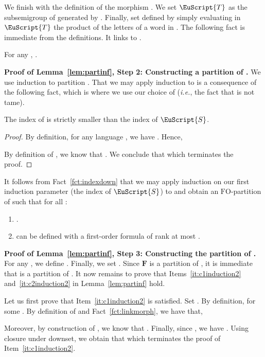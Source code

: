 \documentclass{CSML}
\newcommand\Ss{\ensuremath{\EuScript{S}}\xspace}
\newcommand\Ts{\ensuremath{\EuScript{T}}\xspace}
\newcommand\Fb{\ensuremath{\mathbf{F}}\xspace}
\newcommand{\fo}{\ensuremath{\text{FO}}\xspace}
\theoremstyle{plain}
\begin{document}
We finish with the definition of the morphism . We set \Ts as
the subsemigroup of  generated by . Finally, set  defined by simply evaluating in \Ts the
product of the letters of a word in . The following fact is
immediate from the definitions. It links  to .

\begin{fact} \label{fct:linkmorph}
For any , .
\end{fact}

\medskip
\noindent
{\bf Proof of Lemma~\ref{lem:partinf}, Step 2: Constructing a
  partition of .} We use induction to partition . That
we may apply induction to   is a consequence of the following
fact, which is where we use our choice of  (\emph{i.e.}, the fact that
 is not tame).

\begin{fact} \label{fct:indexdown}
The index of  is strictly smaller than the index of \Ss.
\end{fact}

\begin{proof}
By definition, for any language , we have
. Hence,

By definition of , we know that . We conclude that  which terminates the proof.
\end{proof}

It follows from Fact~\ref{fct:indexdown} that we may apply induction
on our first induction parameter (the index of \Ss) to  and
obtain an \fo-partition  of  such that for all :
\begin{enumerate}
\item .
\item  can be defined with a first-order formula of rank at most
  .
\end{enumerate}

\medskip
\noindent
{\bf Proof of Lemma~\ref{lem:partinf}, Step 3: Constructing the
  partition  of .} For any , we define
. Finally, we set
. Since \Fb is a partition of
, it is immediate that  is a partition of
. It now remains to prove that Items~\ref{it:c1induction2}
and~\ref{it:c2induction2} in Lemma~\ref{lem:partinf} hold.

Let us first prove that Item~\ref{it:c1induction2} is satisfied. Set
. By definition,  for some . By
definition of  and Fact~\ref{fct:linkmorph}, we have that,

Moreover, by construction of , we know that . Finally, since , we have . Using closure under downset, we obtain that
 which terminates the proof of
Item~\ref{it:c1induction2}.
\end{document}
